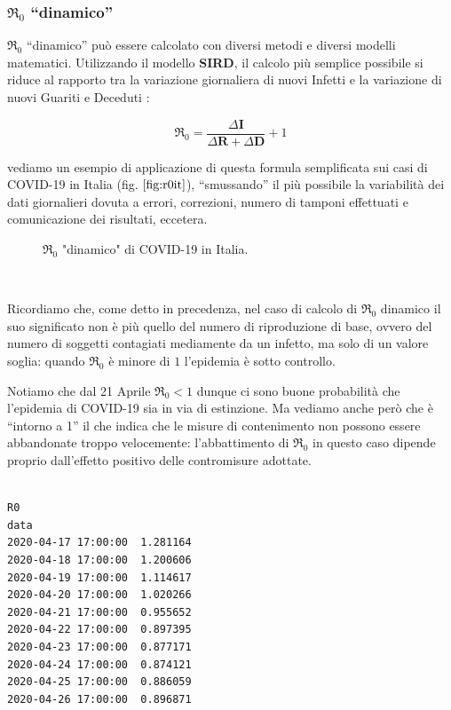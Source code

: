 \documentclass[11pt]{article}
\begin{document}
    \hypertarget{re_0-dinamico}{%
\subsubsection{\texorpdfstring{\(\Re_0\)
``dinamico''}{\textbackslash Re\_0 ``dinamico''}}\label{re_0-dinamico}}

    \(\Re_0\) ``dinamico'' può essere calcolato con diversi metodi e diversi
modelli matematici. Utilizzando il modello \textbf{SIRD}, il calcolo più
semplice possibile si riduce al rapporto tra la variazione giornaliera
di nuovi Infetti e la variazione di nuovi Guariti e Deceduti
\cite{ep_repository_2020}:

\[ \Re_0 = \frac{ \Delta\mathbf{I} }{ \Delta\mathbf{R} + \Delta\mathbf{D} } + 1 \]

vediamo un esempio di applicazione di questa formula semplificata sui
casi di COVID-19 in Italia (fig. \(\ref{fig:r0it}\)), ``smussando'' il più possibile la
variabilità dei dati giornalieri dovuta a errori, correzioni, numero di
tamponi effettuati e comunicazione dei risultati, eccetera.

    \begin{figure}
    \caption{\(\Re_0\) "dinamico" di COVID-19 in Italia.}
    \label{fig:r0it}
    \end{figure}
    { \hspace*{\fill} \\}
    
    Ricordiamo che, come detto in precedenza, nel caso di calcolo di
\(\Re_0\) dinamico il suo significato non è più quello del numero di
riproduzione di base, ovvero del numero di soggetti contagiati
mediamente da un infetto, ma solo di un valore soglia: quando \(\Re_0\)
è minore di \(1\) l'epidemia è sotto controllo.

Notiamo che dal 21 Aprile \(\Re_0 < 1\) dunque ci sono buone probabilità
che l'epidemia di COVID-19 sia in via di estinzione. Ma vediamo anche
però che è ``intorno a 1'' il che indica che le misure di contenimento
non possono essere abbandonate troppo velocemente: l'abbattimento di
\(\Re_0\) in questo caso dipende proprio dall'effetto positivo delle
contromisure adottate.\\
\\

    \begin{Verbatim}[commandchars=\\\{\}]
                           R0
data
2020-04-17 17:00:00  1.281164
2020-04-18 17:00:00  1.200606
2020-04-19 17:00:00  1.114617
2020-04-20 17:00:00  1.020266
2020-04-21 17:00:00  0.955652
2020-04-22 17:00:00  0.897395
2020-04-23 17:00:00  0.877171
2020-04-24 17:00:00  0.874121
2020-04-25 17:00:00  0.886059
2020-04-26 17:00:00  0.896871
    \end{Verbatim}
\end{document}
